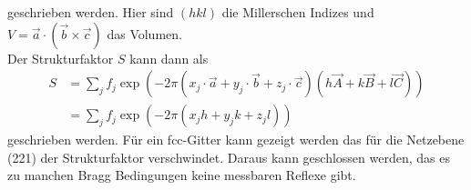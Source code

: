 geschrieben werden. Hier sind $(hkl)$ die Millerschen Indizes und $V=\vec{a}\cdot(\vec{b}\times\vec{c})$ das Volumen.\\
Der Strukturfaktor $S$ kann dann als
\begin{align}
	S &= \sum_j f_j\exp(-2\pi\left(x_j\cdot\vec{a}+y_j\cdot\vec{b}+z_j\cdot\vec{c}\right)\left(h\vec{A}+k\vec{B}+l\vec{C}\right) )\\
	&=\sum_jf_j\exp(-2\pi\left(x_jh+y_jk+z_jl\right))
\end{align}
geschrieben werden. Für ein fcc-Gitter kann gezeigt werden das für die Netzebene (221) der Strukturfaktor verschwindet. Daraus kann geschlossen werden, das es zu manchen Bragg Bedingungen keine messbaren Reflexe gibt.